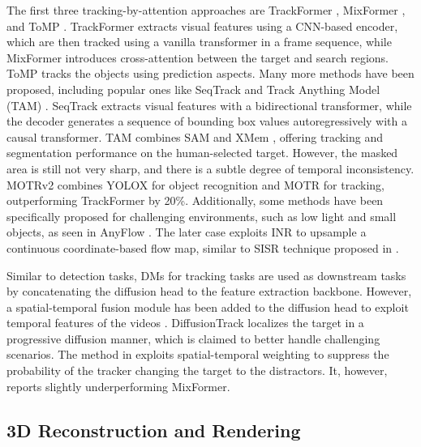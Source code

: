 \documentclass[11pt,a4paper]{article}
\begin{document}
The first three tracking-by-attention approaches are TrackFormer \cite{Meinhardt:TrackFormer:2022}, MixFormer \cite{cui:mixformer:2022}, and ToMP \cite{Mayer:Transforming:2022}. TrackFormer extracts visual features using a CNN-based encoder, which are then tracked using a vanilla transformer \cite{Vaswani:attention:2017} in a frame sequence, while MixFormer introduces cross-attention between the target and search regions. ToMP tracks the objects using prediction aspects. Many more methods have been proposed, including popular ones like SeqTrack \cite{Chen:SeqTrack:2023} and Track Anything Model (TAM) \cite{yang:track:2023}. SeqTrack extracts visual features with a bidirectional transformer, while the decoder generates a sequence of bounding box values autoregressively with a causal transformer. TAM combines SAM \cite{Kirillov:SAM:2023} and XMem \cite{cheng:xmem:2022}, offering tracking and segmentation performance on the human-selected target. However, the masked area is still not very sharp, and there is a subtle degree of temporal inconsistency. MOTRv2 \cite{Zhang:MOTRv2:2023} combines YOLOX \cite{ge:yolox:2021} for object recognition and MOTR \cite{zeng:motr:2022} for tracking, outperforming TrackFormer by 20\%. Additionally, some methods have been specifically proposed for challenging environments, such as low light \cite{Yi:Comprehensive:2024} and small objects, as seen in AnyFlow \cite{Jung:AnyFlow:2023}. The later case exploits INR to upsample a continuous coordinate-based flow map, similar to SISR technique proposed in \cite{Chen:Learning:2021}.

Similar to detection tasks, DMs for tracking tasks are used as downstream tasks by concatenating the diffusion head to the feature extraction backbone. However, a spatial-temporal fusion module has been added to the diffusion head to exploit temporal features of the videos \cite{Luo:DiffusionTrack:2024}. DiffusionTrack \cite{Xie:DiffusionTrack:2024} localizes the target in a progressive diffusion manner, which is claimed to better handle challenging scenarios. The method in \cite{Zhang:DiffusionTracker:2024} exploits spatial-temporal weighting to suppress the probability of the tracker changing the target to the distractors. It, however, reports slightly underperforming MixFormer.



\subsection{3D Reconstruction and Rendering}
\label{ssec:3Dreconstruct}
\end{document}
